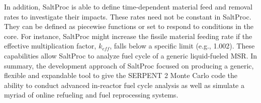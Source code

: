 In addition, SaltProc is able to define time-dependent material feed and 
removal rates to investigate their impacts. These rates need not be 
constant in SaltProc. They can be defined as piecewise functions or set to 
respond to conditions in the core. For instance, SaltProc might increase the 
fissile material feeding rate if the effective multiplication factor, 
$k_{eff}$, falls below a specific limit (e.g., 1.002).
These capabilities allow SaltProc to analyze fuel cycle of a generic 
liquid-fueled \gls{MSR}. In summary, the development approach of SaltProc 
focused on producing a generic, flexible and expandable tool to give the 
SERPENT 2 Monte Carlo code the ability to conduct advanced in-reactor fuel 
cycle analysis as well as simulate a myriad of online refueling and fuel 
reprocessing systems.
